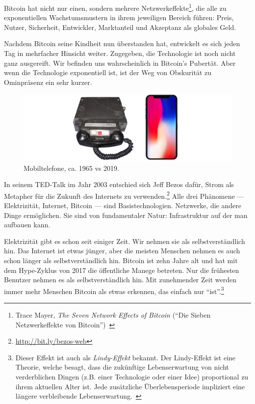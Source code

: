 Bitcoin hat nicht nur einen, sondern mehrere Netzwerkeffekte\footnote{Trace
Mayer, \textit{The Seven Network Effects of Bitcoin} (\enquote{Die Sieben
Netzwerkeffekte von Bitcoin})~\cite{7-network-effects}}, die alle zu
exponentiellen Wachstumsmustern in ihrem jeweiligen Bereich führen: Preis,
Nutzer, Sicherheit, Entwickler, Marktanteil und Akzeptanz als globales Geld.

Nachdem Bitcoin seine Kindheit nun überstanden hat, entwickelt es sich jeden Tag
in mehrfacher Hinsicht weiter. Zugegeben, die Technologie ist noch nicht ganz
ausgereift. Wir befinden uns wahrscheinlich in Bitcoin's Pubertät. Aber wenn die
Technologie exponentiell ist, ist der Weg von Obskurität zu Ominpräsenz ein sehr
kurzer.

\begin{figure}
  \includegraphics{assets/images/mobile-phone.png}
  \caption{Mobiltelefone, ca. 1965 vs 2019.}
  \label{fig:mobile-phone}
\end{figure}

In seinem TED-Talk im Jahr 2003 entschied sich Jeff Bezos dafür, Strom als
Metapher für die Zukunft des Internets zu
verwenden.\footnote{\url{http://bit.ly/bezos-web}} Alle drei Phänomene ---
Elektrizität, Internet, Bitcoin --- sind Basistechnologien. Netzwerke, die
andere Dinge ermöglichen. Sie sind von fundamentaler Natur: Infrastruktur auf
der man aufbauen kann.

Elektrizität gibt es schon seit einiger Zeit. Wir nehmen sie als
selbstverständlich hin. Das Internet ist etwas jünger, aber die meisten Menschen
nehmen es auch schon länger als selbstverständlich hin. Bitcoin ist zehn Jahre
alt und hat mit dem Hype-Zyklus von 2017 die öffentliche Manege betreten. Nur
die frühesten Benutzer nehmen es als selbstverständlich hin. Mit zunehmender
Zeit werden immer mehr Menschen Bitcoin als etwas erkennen, das einfach nur
\enquote{ist}.\footnote{Dieser Effekt ist auch als \textit{Lindy-Effekt}
bekannt. Der Lindy-Effekt ist eine Theorie, welche besagt, dass die zukünftige
Lebenserwartung von nicht verderblichen Dingen (z.B. einer Technologie oder einer
Idee) proportional zu ihrem aktuellen Alter ist. Jede zusätzliche
Überlebensperiode impliziert eine längere verbleibende
Lebenserwartung.~\cite{wiki:lindy}}

